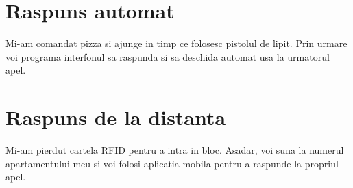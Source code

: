 \section{Raspuns automat}

Mi-am comandat pizza si ajunge in timp ce folosesc pistolul de lipit. Prin urmare voi programa interfonul sa raspunda si sa deschida automat usa la urmatorul apel.

\section{Raspuns de la distanta}

Mi-am pierdut cartela RFID pentru a intra in bloc. Asadar, voi suna la numerul apartamentului meu si voi folosi aplicatia mobila pentru a raspunde la propriul apel.